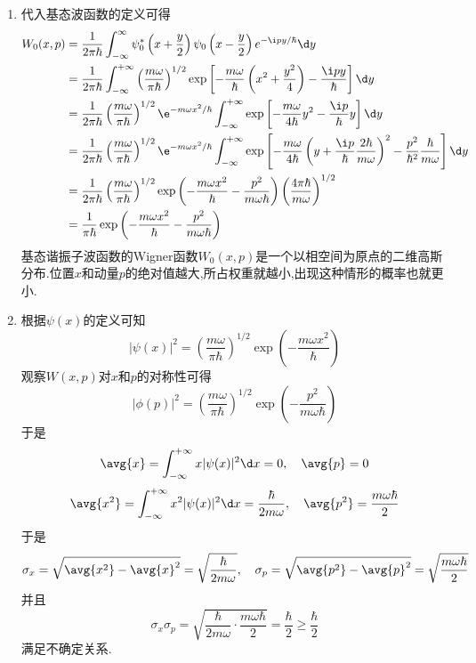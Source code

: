 \documentclass{ctexart}
\begin{document}
\begin{solution}
\begin{enumerate}[label=\tbf{\arabic*.}]
\[\begin{aligned}
        &=\phi^\ast(p)\psi(p)=\left|\phi(p)\right|^2
    \end{aligned}\]
    \item 代入基态波函数的定义可得
    \[\begin{aligned}
        W_0(x, p)
        &=\frac{1}{2\pi\hbar} \int_{-\infty}^{\infty} \psi_0^*\left(x + \frac{y}{2}\right) \psi_0\left(x - \frac{y}{2}\right) e^{-\i p y / \hbar}\d y\\
        &=\dfrac{1}{2\pi\hbar}\int_{-\infty}^{+\infty}\left(\dfrac{m\omega}{\pi\hbar}\right)^{1/2}\exp\left[-\frac{m\omega}{\hbar}\left(x^2+\frac{y^2}{4}\right)-\frac{\i py}{\hbar}\right]\d y\\
        &=\dfrac{1}{2\pi\hbar}\left(\dfrac{m\omega}{\pi\hbar}\right)^{1/2}\e^{-m\omega x^2/\hbar}\int_{-\infty}^{+\infty}\exp\left[-\dfrac{m\omega}{4\hbar}y^2-\dfrac{\i p}{\hbar} y\right]\d y\\
        &=\dfrac{1}{2\pi\hbar}\left(\dfrac{m\omega}{\pi\hbar}\right)^{1/2}\e^{-m\omega x^2/\hbar}\int_{-\infty}^{+\infty}\exp\left[-\dfrac{m\omega}{4\hbar}\left(y+\dfrac{\i p}{\hbar}\dfrac{2\hbar}{m\omega}\right)^2-\dfrac{p^2}{\hbar^2}\dfrac{\hbar}{m\omega}\right]\d y\\
        &=\dfrac{1}{2\pi\hbar}\left(\dfrac{m\omega}{\pi\hbar}\right)^{1/2}\exp\left(-\dfrac{m\omega x^2}{\hbar}-\dfrac{p^2}{m\omega\hbar}\right)\left(\dfrac{4\pi\hbar}{m\omega}\right)^{1/2}\\
        &=\dfrac{1}{\pi\hbar}\exp\left(-\dfrac{m\omega x^2}{\hbar}-\dfrac{p^2}{m\omega\hbar}\right)
    \end{aligned}\]
    基态谐振子波函数的Wigner函数$W_0(x,p)$是一个以相空间为原点的二维高斯分布.位置$x$和动量$p$的绝对值越大,所占权重就越小,出现这种情形的概率也就更小.
    \item 根据$\psi(x)$的定义可知
    \[\left|\psi(x)\right|^2=\left(\dfrac{m\omega}{\pi\hbar}\right)^{1/2}\exp\left(-\dfrac{m\omega x^2}{\hbar}\right)\]
    观察$W(x,p)$对$x$和$p$的对称性可得
    \[\left|\phi(p)\right|^2=\left(\dfrac{m\omega}{\pi\hbar}\right)^{1/2}\exp\left(-\dfrac{p^2}{m\omega\hbar}\right)\]
    于是
    \[\avg{x}=\int_{-\infty}^{+\infty}x|\psi(x)|^2\d x=0,\quad\avg{p}=0\]
    \[\avg{x^2}=\int_{-\infty}^{+\infty}x^2|\psi(x)|^2\d x=\dfrac{\hbar}{2m\omega},\quad\avg{p^2}=\dfrac{m\omega\hbar}{2}\]
    于是
    \[\sigma_x=\sqrt{\avg{x^2}-\avg{x}^2}=\sqrt{\dfrac{\hbar}{2m\omega}},\quad\sigma_p=\sqrt{\avg{p^2}-\avg{p}^2}=\sqrt{\dfrac{m\omega\hbar}{2}}\]
    并且
    \[\sigma_x\sigma_p=\sqrt{\dfrac{\hbar}{2m\omega}\cdot\dfrac{m\omega\hbar}{2}}=\dfrac{\hbar}{2}\geq\dfrac{\hbar}{2}\]
    满足不确定关系.
\end{enumerate}
\end{solution}
\end{document}
